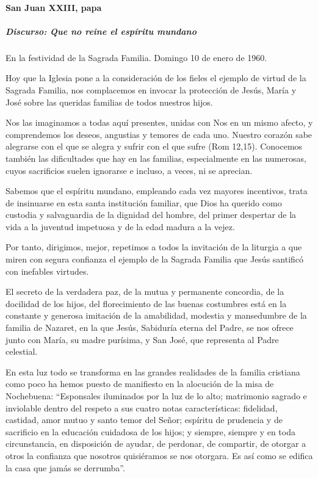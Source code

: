 \documentclass[]{article}
\let\oldparagraph\paragraph
\renewcommand{\paragraph}[1]{\oldparagraph{#1}\mbox{}}
\let\oldsubparagraph\subparagraph
\renewcommand{\subparagraph}[1]{\oldsubparagraph{#1}\mbox{}}
\begin{document}
\paragraph{San Juan XXIII, papa}\label{san-juan-xxiii-papa}

\subparagraph{Discurso: Que no reine el espíritu
mundano}\label{discurso-que-no-reine-el-espuxedritu-mundano}

En la festividad de la Sagrada Familia.  Domingo 10 de enero de 1960.

Hoy que la Iglesia pone a la consideración de los fieles el ejemplo de
virtud de la Sagrada Familia, nos complacemos en invocar la protección
de Jesús, María y José sobre las queridas familias de todos nuestros
hijos.

Nos las imaginamos a todas aquí presentes, unidas con Nos en un mismo
afecto, y comprendemos los deseos, angustias y temores de cada uno.
Nuestro corazón sabe alegrarse con el que se alegra y sufrir con el que
sufre (Rom 12,15). Conocemos también las dificultades que hay en las
familias, especialmente en las numerosas, cuyos sacrificios suelen
ignorarse e incluso, a veces, ni se aprecian.

Sabemos que el espíritu mundano, empleando cada vez mayores incentivos,
trata de insinuarse en esta santa institución familiar, que Dios ha
querido como custodia y salvaguardia de la dignidad del hombre, del
primer despertar de la vida a la juventud impetuosa y de la edad madura
a la vejez.

Por tanto, dirigimos, mejor, repetimos a todos la invitación de la
liturgia a que miren con segura confianza el ejemplo de la Sagrada
Familia que Jesús santificó con inefables virtudes.

El secreto de la verdadera paz, de la mutua y permanente concordia, de
la docilidad de los hijos, del florecimiento de las buenas costumbres
está en la constante y generosa imitación de la amabilidad, modestia y
mansedumbre de la familia de Nazaret, en la que Jesús, Sabiduría eterna
del Padre, se nos ofrece junto con María, su madre purísima, y San José,
que representa al Padre celestial.

En esta luz todo se transforma en las grandes realidades de la familia
cristiana como poco ha hemos puesto de manifiesto en la alocución de la
misa de Nochebuena: ``Esponsales iluminados por la luz de lo alto;
matrimonio sagrado e inviolable dentro del respeto a sus cuatro notas
características: fidelidad, castidad, amor mutuo y santo temor del
Señor; espíritu de prudencia y de sacrificio en la educación cuidadosa
de los hijos; y siempre, siempre y en toda circunstancia, en disposición
de ayudar, de perdonar, de compartir, de otorgar a otros la confianza
que nosotros quisiéramos se nos otorgara. Es así como se edifica la casa
que jamás se derrumba''.
\end{document}
